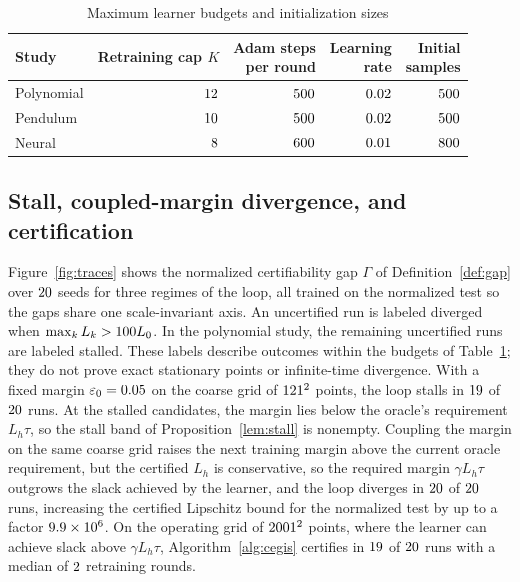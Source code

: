 \documentclass[12pt,onecolumn,journal]{IEEEtran}
\begin{document}
\begin{table}[t]
\caption{Maximum learner budgets and initialization sizes}
\label{tab:protocol}
\centering
\small
\begin{tabular}{lrrrr}
\hline
Study & \shortstack{Retraining\\cap $K$} & \shortstack{Adam steps\\per round} & \shortstack{Learning\\rate} & \shortstack{Initial\\samples} \\
\hline
Polynomial & $12$ & $500$ & $0.02$ & $500$ \\
Pendulum & $10$ & $500$ & $0.02$ & $500$ \\
Neural & $8$ & $600$ & $0.01$ & $800$ \\
\hline
\end{tabular}
\end{table}

\subsection{Stall, coupled-margin divergence, and certification}

Figure~\ref{fig:traces} shows the normalized certifiability gap $\Gamma$ of Definition~\ref{def:gap} over $20$ seeds for three regimes of the loop, all trained on the normalized test so the gaps share one scale-invariant axis. An uncertified run is labeled diverged when $\max_k L_k>100 L_0$. In the polynomial study, the remaining uncertified runs are labeled stalled. These labels describe outcomes within the budgets of Table~\ref{tab:protocol}; they do not prove exact stationary points or infinite-time divergence. With a fixed margin $\varepsilon_0 = 0.05$ on the coarse grid of $121^2$ points, the loop stalls in $19$ of $20$ runs. At the stalled candidates, the margin lies below the oracle's requirement $L_h\tau$, so the stall band of Proposition~\ref{lem:stall} is nonempty. Coupling the margin on the same coarse grid raises the next training margin above the current oracle requirement, but the certified $L_h$ is conservative, so the required margin $\gamma L_h\tau$ outgrows the slack achieved by the learner, and the loop diverges in $20$ of $20$ runs, increasing the certified Lipschitz bound for the normalized test by up to a factor $9.9 \times 10^{6}$. On the operating grid of $2001^2$ points, where the learner can achieve slack above $\gamma L_h\tau$, Algorithm~\ref{alg:cegis} certifies in $19$ of $20$ runs with a median of $2$ retraining rounds. \revLegacySeedsSummary
\end{document}
